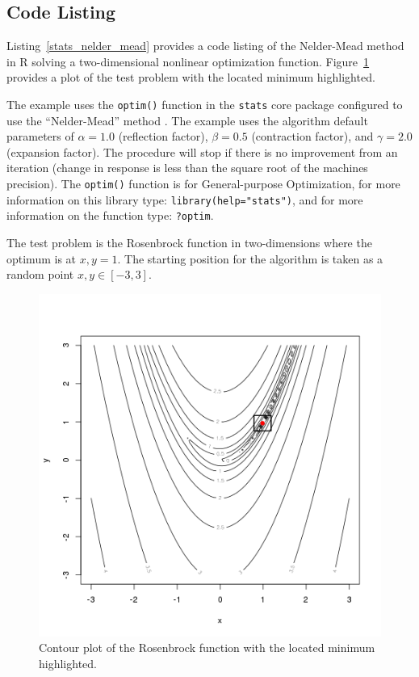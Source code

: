 \subsection{Code Listing}
Listing~\ref{stats_nelder_mead} provides a code listing of the Nelder-Mead method in R solving a two-dimensional nonlinear optimization function. Figure~\ref{plot:nelder_mead_result} provides a plot of the test problem with the located minimum highlighted.

The example uses the \texttt{optim()} function in the \texttt{stats} core package configured to use the ``Nelder-Mead'' method \cite{RDCT2011a}. The example uses the algorithm default parameters of $\alpha=1.0$ (reflection factor), $\beta=0.5$ (contraction factor), and $\gamma=2.0$ (expansion factor). The procedure will stop if there is no improvement from an iteration (change in response is less than the square root of the machines precision). The \texttt{optim()} function is for General-purpose Optimization, for more information on this library type: \texttt{library(help="stats")}, and for more information on the function type: \texttt{?optim}.

The test problem is the Rosenbrock function in two-dimensions where the optimum is at $x,y=1$. The starting position for the algorithm is taken as a random point $x,y \in [-3,3]$.



\begin{figure}[htp]
\centering
\includegraphics[scale=0.45]{book/a_optimization/nelder_mead_result.png}
\caption{Contour plot of the Rosenbrock function with the located minimum highlighted.}
\label{plot:nelder_mead_result}
\end{figure}

